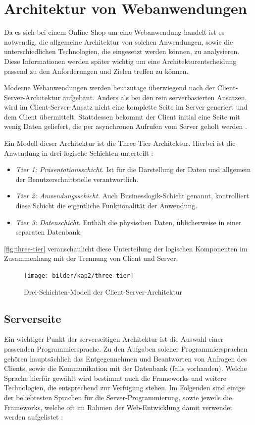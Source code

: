 \section{Architektur von Webanwendungen}\label{web_architecture} \thispagestyle{nomarkstyle}
Da es sich bei einem Online-Shop um eine Webanwendung handelt ist es notwendig, die allgemeine Architektur von solchen Anwendungen, sowie die unterschiedlichen Technologien, die eingesetzt werden können, zu analysieren.
Diese Informationen werden später wichtig um eine Architekturentscheidung passend zu den Anforderungen und Zielen treffen zu können.

Moderne Webanwendungen werden heutzutage überwiegend nach der Client-Server-Architektur aufgebaut. Anders als bei den rein serverbasierten Ansätzen, wird im Client-Server-Ansatz nicht eine komplette Seite im Server generiert und dem Client übermittelt.
Stattdessen bekommt der Client initial eine Seite mit wenig Daten geliefert, die per asynchronen Aufrufen vom Server geholt werden \cite{Saternos2014}.

Ein Modell dieser Architektur ist die Three-Tier-Architektur. Hierbei ist die Anwendung in drei logische Schichten unterteilt \cite{Techopedia2017}:
\begin{itemize}
	\item \textit{Tier 1: Präsentationsschicht.} Ist für die Darstellung der Daten und allgemein der Benutzerschnittstelle verantwortlich.
	\item \textit{Tier 2: Anwendungsschicht.} Auch Businesslogik-Schicht genannt, kontrolliert diese Schicht die eigentliche Funktionalität der Anwendung.
	\item \textit{Tier 3: Datenschicht.} Enthält die physischen Daten, üblicherweise in einer separaten Datenbank.
\end{itemize}

\autoref{fig:three-tier} veranschaulicht diese Unterteilung der logischen Komponenten im Zusammenhang mit der Trennung von Client und Server. %

\begin{figure}[ht!]
	\centering
	\texttt{[image: bilder/kap2/three-tier]}
	\caption{Drei-Schichten-Modell der Client-Server-Architektur \cite{Conallen2000}}
	\label{fig:three-tier}
\end{figure}

\subsection{Serverseite}
Ein wichtiger Punkt der serverseitigen Architektur ist die Auswahl einer passenden Programmiersprache. Zu den Aufgaben solcher Programmiersprachen gehören hauptsächlich das Entgegennehmen und Beantworten von Anfragen des Clients, sowie die Kommunikation mit der Datenbank (falls vorhanden).
Welche Sprache hierfür gewählt wird bestimmt auch die Frameworks und weitere Technologien, die entsprechend zur Verfügung stehen. Im Folgenden sind einige der beliebtesten Sprachen für die Server-Programmierung, sowie jeweils die Frameworks, welche oft im Rahmen der Web-Entwicklung damit verwendet werden aufgelistet \cite{School2016}:

